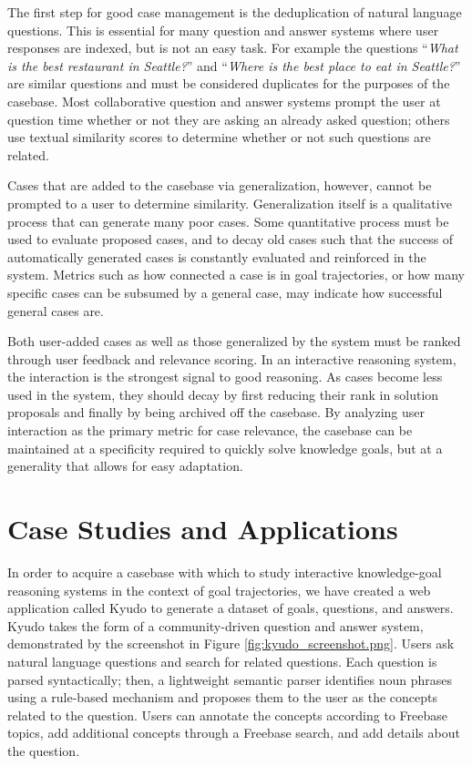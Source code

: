 \documentclass[11pt,letterpaper]{article}
\begin{document}
The first step for good case management is the deduplication of natural language questions. This is essential for many question and answer systems where user responses are indexed, but is not an easy task. For example the questions ``\textit{What is the best restaurant in Seattle?}'' and ``\textit{Where is the best place to eat in Seattle?}'' are similar questions and must be considered duplicates for the purposes of the casebase. Most collaborative question and answer systems prompt the user at question time whether or not they are asking an already asked question; others use textual similarity scores to determine whether or not such questions are related.

Cases that are added to the casebase via generalization, however, cannot be prompted to a user to determine similarity. Generalization itself is a qualitative process that can generate many poor cases. Some quantitative process must be used to evaluate proposed cases, and to decay old cases such that the success of automatically generated cases is constantly evaluated and reinforced in the system. Metrics such as how connected a case is in goal trajectories, or how many specific cases can be subsumed by a general case, may indicate how successful general cases are.

Both user-added cases as well as those generalized by the system must be ranked through user feedback and relevance scoring. In an interactive reasoning system, the interaction is the strongest signal to good reasoning. As cases become less used in the system, they should decay by first reducing their rank in solution proposals and finally by being archived off the casebase. By analyzing user interaction as the primary metric for case relevance, the casebase can be maintained at a specificity required to quickly solve knowledge goals, but at a generality that allows for easy adaptation.

\section{Case Studies and Applications}

In order to acquire a casebase with which to study interactive knowledge-goal reasoning systems in the context of goal trajectories, we have created a web application called Kyudo to generate a dataset of goals, questions, and answers. Kyudo takes the form of a community-driven question and answer system, demonstrated by the screenshot in Figure \ref{fig:kyudo_screenshot.png}. Users ask natural language questions and search for related questions. Each question is parsed syntactically; then, a lightweight semantic parser identifies noun phrases using a rule-based mechanism and proposes them to the user as the concepts related to the question. Users can annotate the concepts according to Freebase topics, add additional concepts through a Freebase search, and add details about the question.
\end{document}
